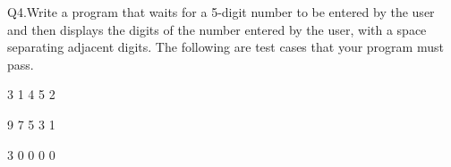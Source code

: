 Q4.Write a program that waits for a 5-digit number to be entered by the user 
and then displays the digits of the number entered by the user, 
with a space separating adjacent digits. 
The following are test cases that your program must pass.

\resett
\nextt
\begin{console}[commandchars=\\\{\}]
3 1 4 5 2
\end{console}

\nextt
\begin{console}[commandchars=\\\{\}]
9 7 5 3 1
\end{console}

\nextt
\begin{console}[commandchars=\\\{\}]
3 0 0 0 0
\end{console}
